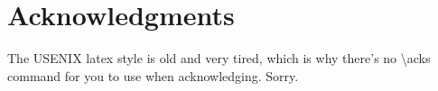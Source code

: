 \section*{Acknowledgments}

The USENIX latex style is old and very tired, which is why
there's no \textbackslash{}acks command for you to use when
acknowledging. Sorry.











